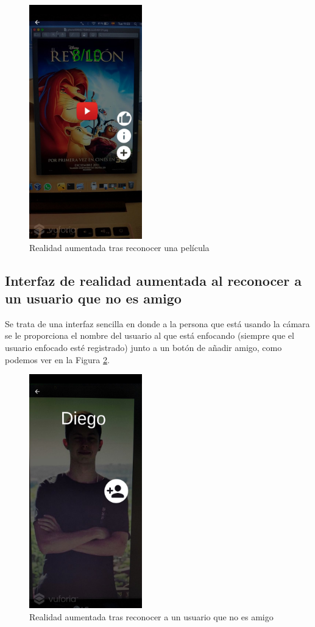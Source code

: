 \begin{figure}[H]
    \centering
    \includegraphics[height=4in]{figures/filmrecognized2.jpg}
    \caption{Realidad aumentada tras reconocer una película}
    \label{fig:ra_pelicula}
\end{figure}

\subsection{Interfaz de realidad aumentada al reconocer a un usuario que no es amigo}
\label{makereference3.4.5.1}
Se trata de una interfaz sencilla en donde a la persona que está usando la cámara se le proporciona el nombre del usuario al
 que está enfocando (siempre que el usuario enfocado esté registrado) junto a un botón de añadir amigo, como podemos ver en la Figura \ref{fig:ra_usuario}.
\begin{figure}[H]
    \centering
    \includegraphics[height=4in]{figures/usernotFriendrecognized.jpg}
    \caption{Realidad aumentada tras reconocer a un usuario que no es amigo}
    \label{fig:ra_usuario}
\end{figure}
